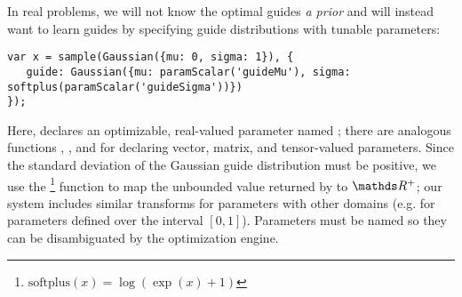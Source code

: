 In real problems, we will not know the optimal guides \emph{a prior} and will instead want to learn guides by specifying guide distributions with tunable parameters:
\begin{lstlisting}
var x = sample(Gaussian({mu: 0, sigma: 1}), {
   guide: Gaussian({mu: paramScalar('guideMu'), sigma: softplus(paramScalar('guideSigma'))})
});
\end{lstlisting}
Here,  declares an optimizable, real-valued parameter named ; there are analogous functions , , and  for declaring vector, matrix, and tensor-valued parameters.
Since the standard deviation  of the Gaussian guide distribution must be positive, we use the \footnote{$\text{softplus}(x) = \log(\exp(x) + 1)$} function to map the unbounded value returned by  to $\Reals^{+}$; our system includes similar transforms for parameters with other domains (e.g.  for parameters defined over the interval $[0, 1]$).
Parameters must be named so they can be disambiguated by the optimization engine.

